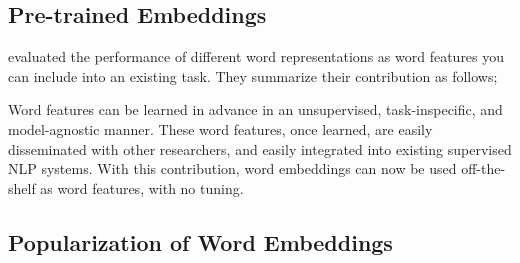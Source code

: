 
\subsection{Pre-trained Embeddings}%
\label{sub:pre_trained_embeddings}

\textcite{p._turian_word_2010} evaluated the performance of different word representations as word features you can include into an existing task.
They summarize their contribution as follows;
\begin{displayquote}
  Word features can be learned in advance in an unsupervised, task-inspecific, and model-agnostic manner.
  These word features, once learned, are easily disseminated with other researchers, and easily integrated into existing supervised NLP systems.
  \textelp{} %
  With this contribution, word embeddings can now be used off-the-shelf as word features, with no tuning.
\end{displayquote}



\subsection{Popularization of Word Embeddings}%
\label{sub:popularization_of_word_embeddings}

